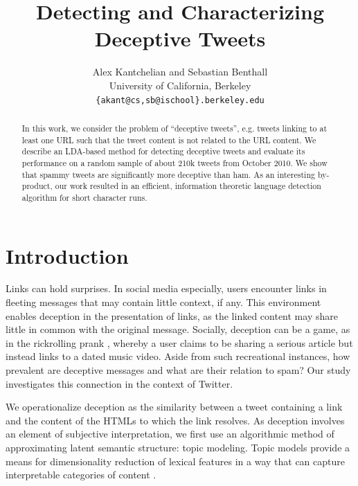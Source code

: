 \documentclass[times, 11pt, twocolumn]{article}
\begin{document}
\title{Detecting and Characterizing Deceptive Tweets}
\author{Alex Kantchelian and Sebastian Benthall \\
University of California, Berkeley \\
 \texttt{\{akant@cs,sb@ischool\}.berkeley.edu}\\
 }
 \date{}

\maketitle

\begin{abstract}
	In this work, we consider the problem of ``deceptive tweets'', e.g. tweets 
	linking to at least one URL such that the tweet content is not related 
	to the URL content. We describe an LDA-based method for detecting deceptive 
	tweets and evaluate its performance on a random sample of about 210k tweets from 
	October 2010. We show that spammy tweets are significantly more deceptive than ham.
	As an interesting by-product, our work resulted in an efficient, 
	information theoretic language detection algorithm for short character runs.
\end{abstract}

\section{Introduction}

Links can hold surprises. In social media especially, users encounter links in fleeting 
messages that may contain little context, if any. This environment enables deception in 
the presentation of links, as the linked content may share little in common 
with the original message. Socially, deception can be a game, as in the rickrolling prank \cite{Wiki2012}, 
whereby a user claims to be sharing a serious article but instead links to a dated music 
video. Aside from such recreational instances, how prevalent are deceptive messages and 
what are their relation to spam? Our study investigates this connection in the context of Twitter.

We operationalize deception as the similarity between a tweet containing a link 
and the content of the HTMLs to which the link resolves. As deception involves an element 
of subjective interpretation, we first use an algorithmic method of approximating latent 
semantic structure: topic modeling. Topic models provide a means for dimensionality reduction 
of lexical features in a way that can capture interpretable categories of content \cite{Blei2003}.
\end{document}
